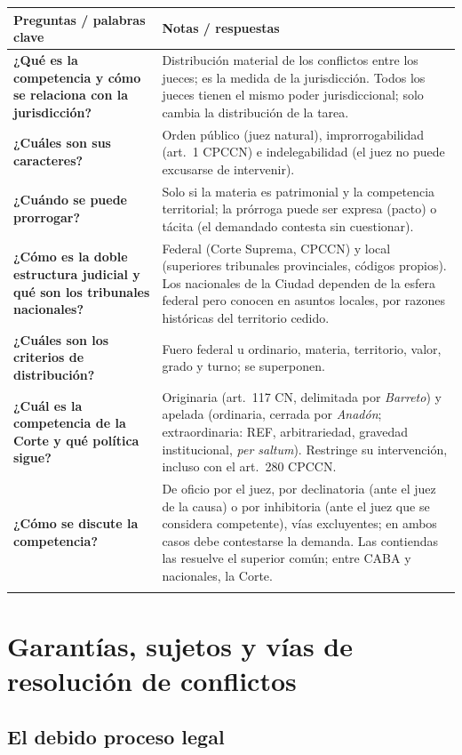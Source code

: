 \documentclass[12pt,oneside]{book}
\newenvironment{cornell}[1]{%
  \par\medskip\noindent{\small\bfseries Cuadro Cornell: #1}\par\smallskip
  \begin{longtable}{|>{\RaggedRight\arraybackslash}p{0.27\textwidth}|>{\RaggedRight\arraybackslash}p{0.66\textwidth}|}
  \hline
  \textbf{\small Preguntas / palabras clave} & \textbf{\small Notas / respuestas} \\ \hline\endhead
}{\end{longtable}\par\medskip}
\newcommand{\cqa}[2]{\textbf{#1} & #2 \\ \hline}
\newcommand{\cornellsummary}[1]{\multicolumn{2}{|p{0.95\textwidth}|}{\textbf{Resumen:} #1} \\ \hline}
\begin{document}
\begin{cornell}{competencia judicial}
\cqa{¿Qué es la competencia y cómo se relaciona con la jurisdicción?}{Distribución material de los conflictos entre los jueces; es la medida de la jurisdicción. Todos los jueces tienen el mismo poder jurisdiccional; solo cambia la distribución de la tarea.}
\cqa{¿Cuáles son sus caracteres?}{Orden público (juez natural), improrrogabilidad (art.~1 CPCCN) e indelegabilidad (el juez no puede excusarse de intervenir).}
\cqa{¿Cuándo se puede prorrogar?}{Solo si la materia es patrimonial y la competencia territorial; la prórroga puede ser expresa (pacto) o tácita (el demandado contesta sin cuestionar).}
\cqa{¿Cómo es la doble estructura judicial y qué son los tribunales nacionales?}{Federal (Corte Suprema, CPCCN) y local (superiores tribunales provinciales, códigos propios). Los nacionales de la Ciudad dependen de la esfera federal pero conocen en asuntos locales, por razones históricas del territorio cedido.}
\cqa{¿Cuáles son los criterios de distribución?}{Fuero federal u ordinario, materia, territorio, valor, grado y turno; se superponen.}
\cqa{¿Cuál es la competencia de la Corte y qué política sigue?}{Originaria (art.~117 CN, delimitada por \textit{Barreto}) y apelada (ordinaria, cerrada por \textit{Anadón}; extraordinaria: REF, arbitrariedad, gravedad institucional, \textit{per saltum}). Restringe su intervención, incluso con el art.~280 CPCCN.}
\cqa{¿Cómo se discute la competencia?}{De oficio por el juez, por declinatoria (ante el juez de la causa) o por inhibitoria (ante el juez que se considera competente), vías excluyentes; en ambos casos debe contestarse la demanda. Las contiendas las resuelve el superior común; entre CABA y nacionales, la Corte.}
\cornellsummary{La competencia reparte los conflictos entre jueces que comparten un mismo poder jurisdiccional. Es de orden público, improrrogable (salvo materia patrimonial y territorial) e indelegable. Se distribuye por fuero, materia, territorio, valor, grado y turno dentro de una doble estructura federal y local. La Corte Suprema restringe su competencia y las discusiones se canalizan por control de oficio, declinatoria e inhibitoria.}
\end{cornell}
\part{Garantías, sujetos y vías de resolución de conflictos}

\chapter{El debido proceso legal}
\label{cap:debido}
\end{document}
